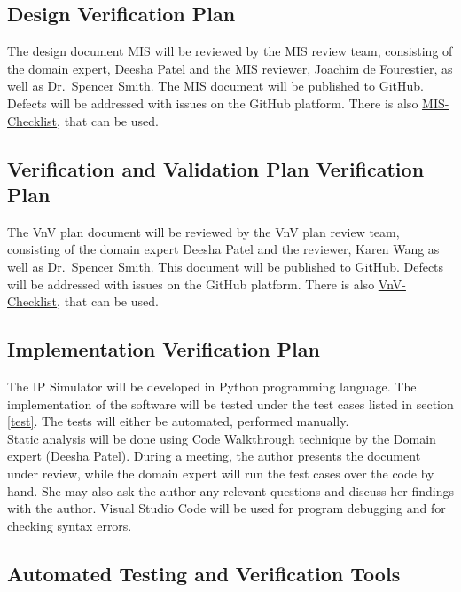 \documentclass[12pt, titlepage]{article}
\begin{document}
\subsection{Design Verification Plan}

The design document MIS will be reviewed by the MIS review team, consisting of the domain expert, Deesha Patel and the MIS reviewer, Joachim de Fourestier, as well as Dr.\ Spencer Smith.
The MIS document will be published to GitHub. Defects will be addressed with issues on the GitHub platform. There is also \href{https://github.com/smiths/capTemplate/blob/main/docs/Checklists/MIS-Checklist.pdf}{MIS-Checklist}, that can be used.

\subsection{Verification and Validation Plan Verification Plan}
The VnV plan document will be reviewed by the VnV plan review team, consisting of the domain expert Deesha Patel and the reviewer, Karen Wang as well as Dr.\ Spencer Smith.
This document will be published to GitHub. Defects will be addressed with issues on the GitHub platform.
There is also \href{https://github.com/smiths/capTemplate/blob/main/docs/Checklists/VnV-Checklist.pdf}{VnV-Checklist}, that can be used.

\subsection{Implementation Verification Plan}

The IP Simulator will be developed in Python programming language. The implementation of the software will be tested under the test cases listed in section \ref{test}. The tests will either be automated, performed manually. \\
Static analysis will be done using Code Walkthrough technique by the Domain expert (Deesha Patel). During a meeting, the author presents the document under review, while the domain expert will run the test cases over the code by hand. She may also ask the author any relevant questions and discuss her findings with the author. Visual Studio Code will be used for program debugging and for checking syntax errors. \\
 
\subsection{Automated Testing and Verification Tools}
\end{document}
